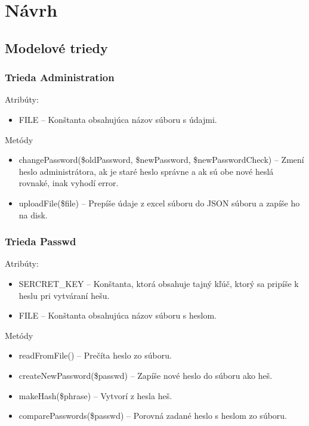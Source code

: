 \documentclass[12pt,a4paper]{report}
\begin{document}
\renewcommand{\chaptername}{}	
\chapter[Návrh]{\rmfamily\bfseries
	Návrh}

\section[Modelové triedy]{\rmfamily\bfseries
	Modelové triedy}

\subsection[Trieda Administration]{\rmfamily\bfseries
	Trieda Administration}
Atribúty:
\begin{itemize}
		\item FILE – Konštanta obsahujúca názov súboru s údajmi. 
\end{itemize}
Metódy
\begin{itemize}
	\item changePassword(\$oldPassword, \$newPassword, \$newPasswordCheck) – Zmení heslo administrátora, ak je staré heslo správne a ak sú obe nové heslá rovnaké, inak vyhodí error.
	\item uploadFile(\$file) – Prepíše údaje z excel súboru do JSON súboru a zapíše ho na disk.
\end{itemize}

\subsection[Trieda Passwd]{\rmfamily\bfseries
	Trieda Passwd}
Atribúty:
\begin{itemize}
	\item SERCRET\_KEY – Konštanta, ktorá obsahuje tajný kľúč, ktorý sa pripíše k heslu pri vytváraní hešu. 
	\item FILE – Konštanta obsahujúca názov súboru s heslom.
\end{itemize}
Metódy
\begin{itemize}
	\item readFromFile() – Prečíta heslo zo súboru.
	\item createNewPassword(\$passwd) – Zapíše nové heslo do súboru ako heš.
	\item makeHash(\$phrase) – Vytvorí z hesla heš.
	\item comparePasswords(\$passwd) – Porovná zadané heslo s heslom zo súboru.
\end{itemize}
\end{document}
